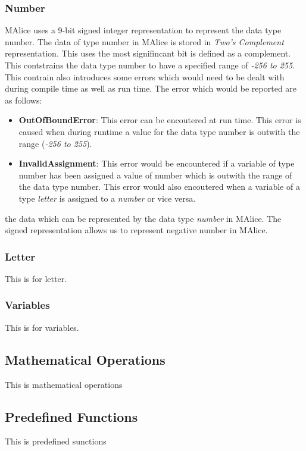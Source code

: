 \documentclass[a4wide, 11pt]{article}
\begin{document}
	\subsubsection{Number}
	\label{sec:num}
	MAlice uses a 9-bit signed integer representation to represent the data type number. The data of type
	number in MAlice is stored in \emph{Two's Complement} representation. This uses the most signifincant
	bit is defined as a complement. 
	This contstrains the data type number to have a specified range of \emph{-256 to 255}. This
	contrain also introduces some errors which would need to be dealt with during compile time as
	well as run time. The error which would be reported are as follows:
	\begin{itemize}
		\item {\bf OutOfBoundError}: This error can be encoutered at run time. 
					This error is caused when during
					runtime a value for the data type number is outwith the range (\emph{-256 to 255}).
		\item {\bf InvalidAssignment}: This error would be encountered if a 
					variable of type number has been assigned a value of number which is 
					outwith the range of the data type number. This error
					would also encoutered when a variable of a type \emph{letter} is assigned to a \emph{number}
					or vice versa.
	\end{itemize}
	the data which can be represented by the data type \emph{number} in MAlice. The signed representation
	allows us to represent negative number in MAlice.
	
	\subsubsection{Letter}
	\label{sec:letter}
	This is for letter.

	\subsubsection{Variables}
	\label{sec:var}
	This is for variables.

\subsection{Mathematical Operations}
\label{sec:mathOper}
This is mathematical operations

\subsection{Predefined Functions}
\label{sec:preFunc}
This is predefined sunctions
\end{document}
